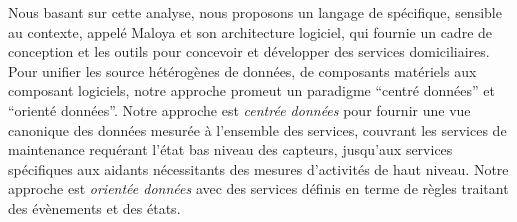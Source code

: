 Nous basant sur cette analyse, nous proposons un langage de spécifique, sensible au contexte, appelé Maloya et son architecture logiciel, qui fournie un cadre de conception et les outils pour concevoir et développer des services domiciliaires. Pour unifier les source hétérogènes de données, de composants matériels aux composant logiciels, notre approche promeut un paradigme ``centré données'' et ``orienté données''. Notre approche est {\em centrée données} pour fournir une vue canonique des données mesurée à l'ensemble des services, couvrant les services de maintenance requérant l'état bas niveau des capteurs, jusqu'aux services spécifiques aux aidants nécessitants des mesures d'activités de haut niveau. Notre approche est {\em orientée données} avec des services définis en terme de règles traitant des évènements et des états.






